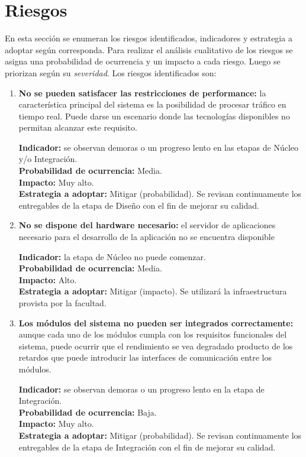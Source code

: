 \section*{Riesgos}

En esta sección se enumeran los riesgos identificados, indicadores y estrategia a adoptar según corresponda. Para realizar el análisis cualitativo de los riesgos se asigna una probabilidad de ocurrencia y un impacto a cada riesgo. Luego se priorizan según su \textit{severidad}. Los riesgos identificados son:

\begin{enumerate}
\item \textbf{No se pueden satisfacer las restricciones de performance:} la característica principal del sistema es la posibilidad de procesar tráfico en tiempo real. Puede darse un escenario donde las tecnologías disponibles no permitan alcanzar este requisito.

\textbf{Indicador:} se observan demoras o un progreso lento en las etapas de Núcleo y/o Integración. \\
\textbf{Probabilidad de ocurrencia:} Media. \\
\textbf{Impacto:} Muy alto. \\
\textbf{Estrategia a adoptar:} Mitigar (probabilidad).
Se revisan continuamente los entregables de la etapa de Diseño con el fin de mejorar su calidad.

\item \textbf{No se dispone del hardware necesario:} el servidor de aplicaciones necesario para el desarrollo de la aplicación no se encuentra disponible

\textbf{Indicador:} la etapa de Núcleo no puede comenzar. \\
\textbf{Probabilidad de ocurrencia:} Media. \\
\textbf{Impacto:} Alto. \\
\textbf{Estrategia a adoptar:} Mitigar (impacto).
Se utilizará la infraestructura provista por la facultad.

\item \textbf{Los módulos del sistema no pueden ser integrados correctamente:} aunque cada uno de los módulos cumpla con los requisitos funcionales del sistema, puede ocurrir que el rendimiento se vea degradado producto de los retardos que puede introducir las interfaces de comunicación entre los módulos.

\textbf{Indicador:} se observan demoras o un progreso lento en la etapa de Integración. \\
\textbf{Probabilidad de ocurrencia:} Baja. \\
\textbf{Impacto:} Muy alto. \\
\textbf{Estrategia a adoptar:} Mitigar (probabilidad).
Se revisan continuamente los entregables de la etapa de Integración con el fin de mejorar su calidad.


\end{enumerate}
